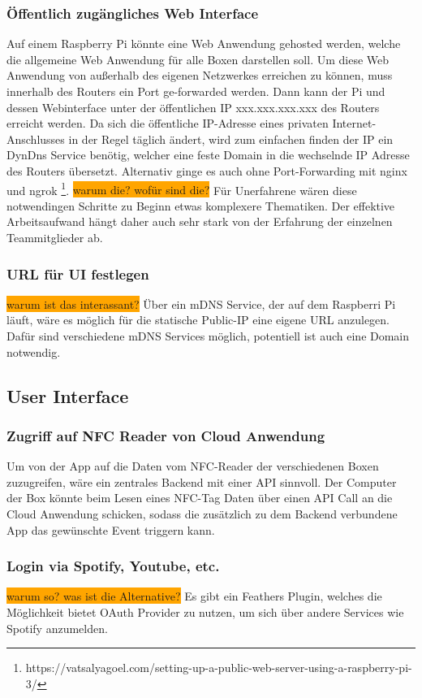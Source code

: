 \documentclass[10pt, a4paper]{article}
\begin{document}
\begin{onehalfspace}
\subsubsection{Öffentlich zugängliches Web Interface}
Auf einem Raspberry Pi könnte eine Web Anwendung gehosted werden, welche die allgemeine Web Anwendung für alle Boxen darstellen soll.
Um diese Web Anwendung von außerhalb des eigenen Netzwerkes erreichen zu können, muss innerhalb des Routers ein Port ge-forwarded werden.
Dann kann der Pi und dessen Webinterface unter der öffentlichen IP xxx.xxx.xxx.xxx des Routers erreicht werden.
Da sich die öffentliche IP-Adresse eines privaten Internet-Anschlusses in der Regel täglich ändert, wird zum einfachen finden der IP ein DynDns Service benötig, welcher eine feste Domain in die wechselnde IP Adresse des Routers übersetzt.
Alternativ ginge es auch ohne Port-Forwarding mit nginx und ngrok \footnote{https://vatsalyagoel.com/setting-up-a-public-web-server-using-a-raspberry-pi-3/}.
\colorbox{orange}{warum die? wofür sind die?}
Für Unerfahrene wären diese notwendingen Schritte zu Beginn etwas komplexere Thematiken. Der effektive Arbeitsaufwand hängt daher auch sehr stark von der Erfahrung der einzelnen Teammitglieder ab.

\subsubsection{URL für UI festlegen}
\colorbox{orange}{warum ist das interassant?}
Über ein mDNS Service, der auf dem Raspberri Pi läuft, wäre es möglich für die statische Public-IP eine eigene URL anzulegen.
Dafür sind verschiedene mDNS Services möglich, potentiell ist auch eine Domain notwendig.

\subsection{User Interface}
\subsubsection{Zugriff auf NFC Reader von Cloud Anwendung}
Um von der App auf die Daten vom NFC-Reader der verschiedenen Boxen zuzugreifen, wäre ein zentrales Backend mit einer API sinnvoll.
Der Computer der Box könnte beim Lesen eines NFC-Tag Daten über einen API Call an die Cloud Anwendung schicken, sodass die zusätzlich zu dem Backend verbundene App das gewünschte Event triggern kann.

\subsubsection{Login via Spotify, Youtube, etc.}
\colorbox{orange}{warum so? was ist die Alternative?}
Es gibt ein Feathers Plugin, welches die Möglichkeit bietet OAuth Provider zu nutzen, um sich über andere Services wie Spotify anzumelden.


\end{onehalfspace}
\end{document}
